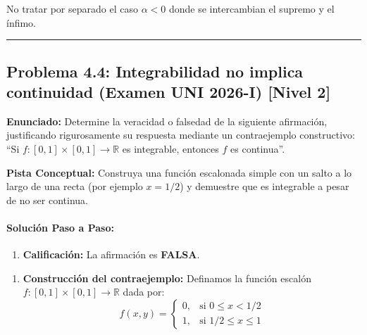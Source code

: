 \documentclass[11pt,a4paper]{article}
\begin{document}
\begin{trapbox}
No tratar por separado el caso $\alpha < 0$ donde se intercambian el supremo y el ínfimo.
\end{trapbox}

\vspace{0.5cm}
\hrule
\vspace{0.5cm}

\subsection*{Problema 4.4: Integrabilidad no implica continuidad (Examen UNI 2026-I) \hfill \color{primaryblue}\small[Nivel 2]}

\begin{tcolorbox}[colback=white,colframe=gray!40,arc=1mm,boxrule=0.5pt,left=3mm,right=3mm,top=2mm,bottom=2mm]
\textbf{Enunciado:} Determine la veracidad o falsedad de la siguiente afirmación, justificando rigurosamente su respuesta mediante un contraejemplo constructivo:
``Si $f: [0, 1] \times [0, 1] \to \mathbb{R}$ es integrable, entonces $f$ es continua''.
\end{tcolorbox}

\begin{tcolorbox}[colback=yellow!4,colframe=accentamber!70,arc=1mm,boxrule=0.5pt,left=3mm,right=3mm,top=1.5mm,bottom=1.5mm]
\textbf{Pista Conceptual:} Construya una función escalonada simple con un salto a lo largo de una recta (por ejemplo $x=1/2$) y demuestre que es integrable a pesar de no ser continua.
\end{tcolorbox}

\paragraph{Solución Paso a Paso:}\par
\begin{enumerate}[label=\textbf{\arabic*.}]
\item \textbf{Calificación:} La afirmación es \textbf{FALSA}.
\end{enumerate}

\begin{enumerate}[label=\textbf{\arabic*.}]
\item \textbf{Construcción del contraejemplo:}
Definamos la función escalón $f: [0, 1] \times [0, 1] \to \mathbb{R}$ dada por:
\begin{equation*}
f(x,y) = \begin{cases} 0, & \text{si } 0 \le x < 1/2 \\ 1, & \text{si } 1/2 \le x \le 1 \end{cases}
\end{equation*}
\end{enumerate}
\end{document}
